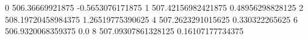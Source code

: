0 506.36669921875 -0.5653076171875
1 507.42156982421875 0.48956298828125
2 508.19720458984375 1.26519775390625
4 507.2623291015625 0.330322265625
6 506.9320068359375 0.0
8 507.09307861328125 0.16107177734375
